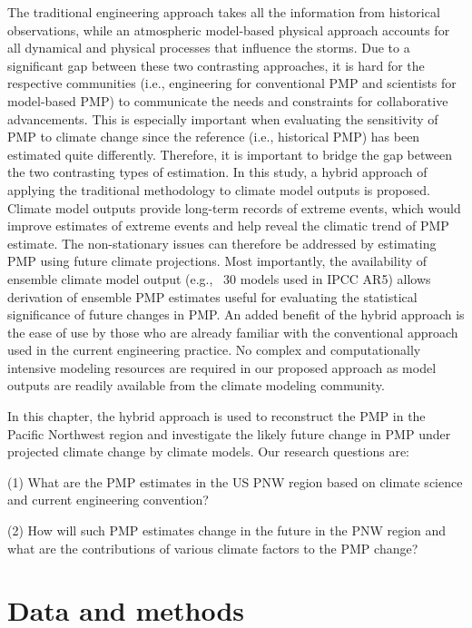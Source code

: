 The traditional engineering approach takes all the information from historical observations, while an atmospheric model-based physical approach accounts for all dynamical and physical processes that influence the storms. Due to a significant gap between these two contrasting approaches, it is hard for the respective communities (i.e., engineering for conventional PMP and scientists for model-based PMP) to communicate the needs and constraints for collaborative advancements. This is especially important when evaluating the sensitivity of PMP to climate change since the reference (i.e., historical PMP) has been estimated quite differently. Therefore, it is important to bridge the gap between the two contrasting types of estimation. In this study, a hybrid approach of applying the traditional methodology to climate model outputs is proposed. Climate model outputs provide long-term records of extreme events, which would improve estimates of extreme events and help reveal the climatic trend of PMP estimate. The non-stationary issues can therefore be addressed by estimating PMP using future climate projections. Most importantly, the availability of ensemble climate model output (e.g., ~30 models used in IPCC AR5) allows derivation of ensemble PMP estimates useful for evaluating the statistical significance of future changes in PMP. An added benefit of the hybrid approach is the ease of use by those who are already familiar with the conventional approach used in the current engineering practice. No complex and computationally intensive modeling resources are required in our proposed approach as model outputs are readily available from the climate modeling community.

In this chapter, the hybrid approach is used to reconstruct the PMP in the Pacific Northwest region and investigate the likely future change in PMP under projected climate change by climate models. Our research questions are:

(1) What are the PMP estimates in the US PNW region based on climate science and current engineering convention?

(2) How will such PMP estimates change in the future in the PNW region and what are the contributions of various climate factors to the PMP change?

\section{Data and methods}


